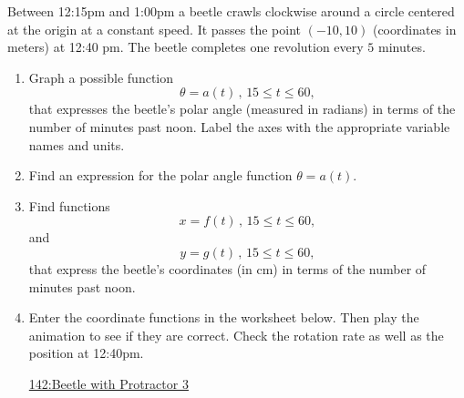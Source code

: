 \documentclass{ximera}
\begin{document}
\begin{question}  \label{QLDFg4tbbfg}
Between 12:15pm and 1:00pm a beetle crawls clockwise around a circle centered at the origin at a constant speed. It passes the point $(-10,10)$ (coordinates in meters) at 12:40 pm. The beetle completes one revolution every $5$ minutes.

\begin{enumerate}
\item Graph a possible function
\[
 \theta = a(t) \, , \, 15\leq t \leq 60 ,
\]
that expresses the beetle's polar angle (measured in radians) in terms of the number of minutes past noon. Label the axes with the appropriate variable names and units.

\item Find an expression for the polar angle function $\theta = a(t)$.

\item Find functions
\[
     x = f(t) \, , \, 15 \leq t \leq 60,
\]
and
\[
     y = g(t) \, , \, 15 \leq t \leq 60,
\]
that express the beetle's coordinates (in cm) in terms of the number of minutes past noon.

\item Enter the coordinate functions in the worksheet below. Then play the animation to see if they are correct. Check the rotation rate as well as the position at 12:40pm.

\begin{onlineOnly}
    \begin{center}
\end{center}
\end{onlineOnly}

\href{https://www.desmos.com/calculator/vqlcelbo1v}{142:Beetle with Protractor 3}


\end{enumerate}
\end{question}
\end{document}

